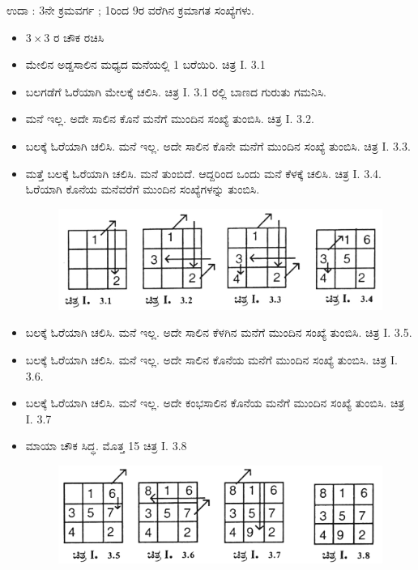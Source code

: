 ಉದಾ : 3ನೇ ಕ್ರಮವರ್ಗ ; 1ರಿಂದ 9ರ ವರೆಗಿನ ಕ್ರಮಾಗತ ಸಂಖ್ಯೆಗಳು.
\begin{itemize}
	\item $3 \times 3$ ರ ಚೌಕ ರಚಿಸಿ\smallskip
	\item ಮೇಲಿನ ಅಡ್ಡಸಾಲಿನ ಮಧ್ಯದ ಮನೆಯಲ್ಲಿ 1 ಬರೆಯಿರಿ. ಚಿತ್ರ I. 3.1\smallskip
	\item ಬಲಗಡೆಗೆ ಓರೆಯಾಗಿ ಮೇಲಕ್ಕೆ ಚಲಿಸಿ. ಚಿತ್ರ I. 3.1 ರಲ್ಲಿ ಬಾಣದ ಗುರುತು ಗಮನಿಸಿ.\smallskip
	\item ಮನೆ ಇಲ್ಲ. ಅದೇ ಸಾಲಿನ ಕೊನೆ ಮನೆಗೆ ಮುಂದಿನ ಸಂಖ್ಯೆ ತುಂಬಿಸಿ. ಚಿತ್ರ I. 3.2.\smallskip
	\item ಬಲಕ್ಕೆ ಓರೆಯಾಗಿ ಚಲಿಸಿ. ಮನೆ ಇಲ್ಲ. ಅದೇ ಸಾಲಿನ ಕೊನೇ ಮನೆಗೆ ಮುಂದಿನ ಸಂಖ್ಯೆ ತುಂಬಿಸಿ. ಚಿತ್ರ I. 3.3.\smallskip
	\item ಮತ್ತೆ ಬಲಕ್ಕೆ ಓರೆಯಾಗಿ ಚಲಿಸಿ. ಮನೆ ತುಂಬಿದೆ. ಆದ್ದರಿಂದ ಒಂದು ಮನೆ ಕೆಳಕ್ಕೆ ಚಲಿಸಿ. ಚಿತ್ರ I. 3.4. ಓರೆಯಾಗಿ ಕೊನೆಯ ಮನೆವರೆಗೆ ಮುಂದಿನ ಸಂಖ್ಯೆಗಳನ್ನು ತುಂಬಿಸಿ.
	\begin{figure}[H]
	\includegraphics{src/figures/chap3/fig3-6.jpg}
	\end{figure}
	\item ಬಲಕ್ಕೆ ಓರೆಯಾಗಿ ಚಲಿಸಿ. ಮನೆ ಇಲ್ಲ. ಅದೇ ಸಾಲಿನ ಕೆಳಗಿನ ಮನೆಗೆ ಮುಂದಿನ ಸಂಖ್ಯೆ ತುಂಬಿಸಿ. ಚಿತ್ರ I. 3.5.\smallskip
	\item ಬಲಕ್ಕೆ ಓರೆಯಾಗಿ ಚಲಿಸಿ. ಮನೆ ಇಲ್ಲ. ಅದೇ ಸಾಲಿನ ಕೊನೆಯ ಮನೆಗೆ ಮುಂದಿನ ಸಂಖ್ಯೆ ತುಂಬಿಸಿ. ಚಿತ್ರ I. 3.6.\smallskip
	\item ಬಲಕ್ಕೆ ಓರೆಯಾಗಿ ಚಲಿಸಿ. ಮನೆ ಇಲ್ಲ. ಅದೇ ಕಂಭಸಾಲಿನ ಕೊನೆಯ ಮನೆಗೆ \break ಮುಂದಿನ ಸಂಖ್ಯೆ ತುಂಬಿಸಿ. ಚಿತ್ರ I. 3.7\smallskip
	\item ಮಾಯಾ ಚೌಕ ಸಿದ್ಧ. ಮೊತ್ತ 15 ಚಿತ್ರ I. 3.8
	\begin{figure}[H]	
	\includegraphics{src/figures/chap3/fig3-7.jpg}
	\end{figure}

\end{itemize}
